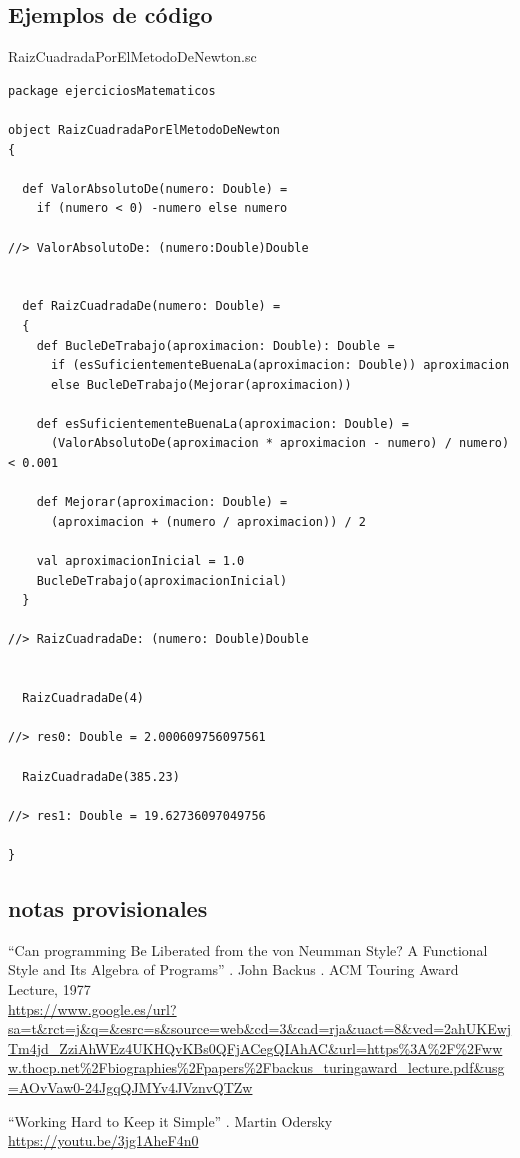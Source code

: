 \documentclass[spanish,12pt,a4paper,final,oneside]{book}
\begin{document}
\subsection*{Ejemplos de código}
RaizCuadradaPorElMetodoDeNewton.sc
\begin{lstlisting}[frame=single]
package ejerciciosMatematicos

object RaizCuadradaPorElMetodoDeNewton
{

  def ValorAbsolutoDe(numero: Double) =
    if (numero < 0) -numero else numero  

//> ValorAbsolutoDe: (numero:Double)Double

    
  def RaizCuadradaDe(numero: Double) =
  {
    def BucleDeTrabajo(aproximacion: Double): Double =
      if (esSuficientementeBuenaLa(aproximacion: Double)) aproximacion
      else BucleDeTrabajo(Mejorar(aproximacion))
      
    def esSuficientementeBuenaLa(aproximacion: Double) =
      (ValorAbsolutoDe(aproximacion * aproximacion - numero) / numero) < 0.001
      
    def Mejorar(aproximacion: Double) =
      (aproximacion + (numero / aproximacion)) / 2
    
    val aproximacionInicial = 1.0
    BucleDeTrabajo(aproximacionInicial)
  }

//> RaizCuadradaDe: (numero: Double)Double

    
  RaizCuadradaDe(4)

//> res0: Double = 2.000609756097561

  RaizCuadradaDe(385.23)

//> res1: Double = 19.62736097049756

}
\end{lstlisting}

\subsection*{notas provisionales}
``Can programming Be Liberated from the von Neumman Style? A Functional Style and Its Algebra of Programs'' . John Backus . ACM Touring Award Lecture, 1977
\\ \url{https://www.google.es/url?sa=t&rct=j&q=&esrc=s&source=web&cd=3&cad=rja&uact=8&ved=2ahUKEwjTm4jd_ZziAhWEz4UKHQvKBs0QFjACegQIAhAC&url=https%3A%2F%2Fwww.thocp.net%2Fbiographies%2Fpapers%2Fbackus_turingaward_lecture.pdf&usg=AOvVaw0-24JgqQJMYv4JVznvQTZw}

``Working Hard to Keep it Simple'' . Martin Odersky
\\ \url{https://youtu.be/3jg1AheF4n0}
\end{document}
